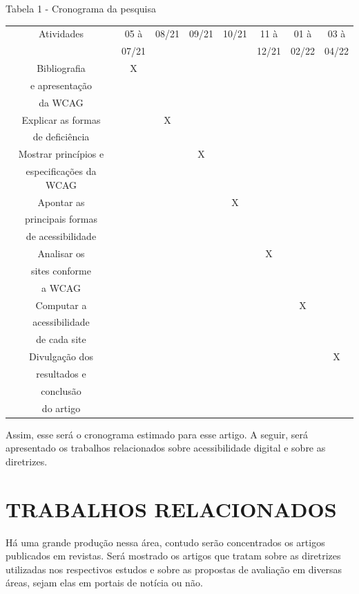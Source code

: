 \documentclass[a4paper]{article}
\begin{document}
\begin{titlepage}
Tabela 1 - Cronograma da pesquisa\\
\begin{center}
	\fontsize{8pt}{8pt}\selectfont
	\begin{tabular}{|cccccccc|}
		\hline
		Atividades & 05 à & 08/21 & 09/21 & 10/21 & 11 à & 01 à & 03 à\\
		 & 07/21 & & & & 12/21 & 02/22 & 04/22\\
		\hline
		Bibliografia & X & & & & & & \\
		e apresentação & & & & & & & \\
		da WCAG & & & & & & & \\
		\hline
		Explicar as formas & & X & & & & & \\
		de deficiência & & & & & & & \\
		\hline
		Mostrar princípios e & & & X & & & & \\
		especificações da WCAG & & & & & & & \\
		\hline
		Apontar as & & & & X & & & \\
		principais formas & & & & & & & \\
		de acessibilidade & & & & & & & \\
		\hline
		Analisar os & & & & & X & & \\
		sites conforme & & & & & & & \\
		a WCAG & & & & & & & \\
		\hline
		Computar a & & & & & & X & \\
		acessibilidade & & & & & & & \\
		de cada site & & & & & & & \\
		\hline
		Divulgação dos & & & & & & & X \\
		resultados e & & & & & & & \\
		conclusão & & & & & & & \\
		do artigo & & & & & & & \\
		\hline
	\end{tabular}
\end{center}

Assim, esse será o cronograma estimado para esse artigo. A seguir, será apresentado os trabalhos relacionados sobre acessibilidade digital e sobre as diretrizes.

\section{TRABALHOS RELACIONADOS}
Há uma grande produção nessa área, contudo serão concentrados os artigos publicados em revistas. Será mostrado os artigos que tratam sobre as diretrizes utilizadas nos respectivos estudos e sobre as propostas de avaliação em diversas áreas, sejam elas em portais de notícia ou não.


\end{titlepage}
\end{document}
